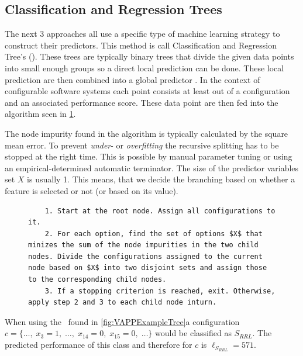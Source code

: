 \subsection{Classification and Regression Trees}
\label{sec:CART}
The next 3 approaches all use a specific type of machine learning strategy to construct their predictors. This method is call Classification and Regression Tree's (\CART). These trees are typically binary trees that divide the given data points into small enough groups so a direct local prediction can be done. These local prediction are then combined into a global predictor \cite{VariabilityAwarePerformancePredictionJianmeiSigmundApel}. In the context of configurable software systems each point consists at least out of a configuration and an associated performance score. These data point are then fed into the algorithm seen in \cref{alg:CART}.

The node impurity found in the algorithm is typically calculated by the square mean error. To prevent \textit{under}- or \textit{overfitting}\cite{ElementsOfStatisticalLearning} the recursive splitting has to be stopped at the right time. This is possible by manual parameter tuning or using an empirical-determined automatic terminator. The size of the predictor variables set $X$ is usually 1. This means, that we decide the branching based on whether a feature is selected or not (or based on its value).
\setlength\intextsep{0pt}
\begin{figure}[t]
	\lstset{
		mathescape,
		breaklines=true,
	}
	\begin{lstlisting}
	1. Start at the root node. Assign all configurations to it.
	2. For each option, find the set of options $X$ that minizes the sum of the node impurities in the two child nodes. Divide the configurations assigned to the current node based on $X$ into two disjoint sets and assign those to the corresponding child nodes.
	3. If a stopping criterion is reached, exit. Otherwise, apply step 2 and 3 to each child node inturn.
	\end{lstlisting}
	\label{alg:CART}
\end{figure}
When using the \CART~found in \cref{fig:VAPPExampleTree}a configuration $c=\{\dots,\;x_3=1,\;\dots,\;x_{14}=0,\;x_{15}=0,\;\dots\}$ would be classified as $S_{RRL}$. The predicted performance of this class and therefore for $c$ is $\ell_{S_{RRL}}=571$.

